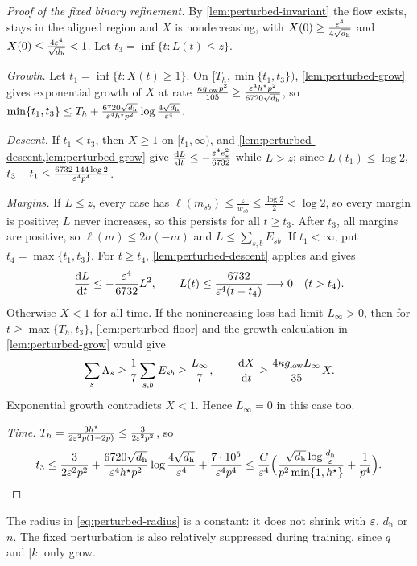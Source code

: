 \begin{proof}[Proof of the fixed binary refinement]
By \cref{lem:perturbed-invariant} the flow exists, stays in the aligned region and $X$ is nondecreasing, with
$X(0)\ge\frac{\varepsilon^4}{4\sqrt{d_{\mathrm h}}}$ and $X(0)\le\frac{4\varepsilon^4}{\sqrt{d_{\mathrm h}}}<1$. Let $t_3=\inf\{t:L(t)\le z\}$.

\emph{Growth.} Let $t_1=\inf\{t:X(t)\ge1\}$. On $[T_h,\min\{t_1,t_3\})$, \cref{lem:perturbed-grow} gives exponential growth of $X$ at rate
$\frac{\kappa g_{\mathrm{low}}p^2}{105}\ge\frac{\varepsilon^4h^\star p^2}{6720\sqrt{d_{\mathrm h}}}$, so
$\min\{t_1,t_3\}\le T_h+\frac{6720\sqrt{d_{\mathrm h}}}{\varepsilon^4h^\star p^2}\log\frac{4\sqrt{d_{\mathrm h}}}{\varepsilon^4}$.

\emph{Descent.} If $t_1<t_3$, then $X\ge1$ on $[t_1,\infty)$, and \cref{lem:perturbed-descent,lem:perturbed-grow} give
$\ddt{L}\le-\frac{\initscale^4e_\ast^2}{6732}$ while $L>z$; since $L(t_1)\le\log2$, $t_3-t_1\le\frac{6732\cdot144\log2}{\varepsilon^4p^4}$.

\emph{Margins.} If $L\le z$, every case has $\ell(m_{sb})\le\frac{z}{w_{sb}}\le\frac{\log2}2<\log2$, so every margin is positive; $L$ never increases,
so this persists for all $t\ge t_3$. After $t_3$, all margins are positive, so
$\ell(m)\le2\sigma(-m)$ and $L\le\sum_{s,b}E_{sb}$.
If $t_1<\infty$, put $t_4=\max\{t_1,t_3\}$. For $t\ge t_4$,
\cref{lem:perturbed-descent} applies and gives
\[
 \ddt{L}\le-\frac{\initscale^4}{6732}L^2,\qquad
 L(t)\le\frac{6732}{\initscale^4(t-t_4)}\longrightarrow0
 \quad(t>t_4).
\]
Otherwise $X<1$ for all time. If the nonincreasing loss had limit
$L_\infty>0$, then for $t\ge\max\{T_h,t_3\}$,
\cref{lem:perturbed-floor} and the growth calculation in
\cref{lem:perturbed-grow} would give
\[
 \sum_s\Lambda_s\ge\frac17\sum_{s,b}E_{sb}\ge\frac{L_\infty}{7},\qquad
 \ddt{X}\ge\frac{4\kappa g_{\mathrm{low}}L_\infty}{35}X.
\]
Exponential growth contradicts $X<1$. Hence $L_\infty=0$ in this case too.

\emph{Time.} $T_h=\frac{3h^\star}{2\varepsilon^2p(1-2p)}\le\frac{3}{2\varepsilon^2p^2}$, so
\[
 t_3\le\frac{3}{2\varepsilon^2p^2}+\frac{6720\sqrt{d_{\mathrm h}}}{\varepsilon^4h^\star p^2}\log\frac{4\sqrt{d_{\mathrm h}}}{\varepsilon^4}+\frac{7\cdot10^5}{\varepsilon^4p^4}
 \le\frac{C}{\varepsilon^4}\Bigl(\frac{\sqrt{d_{\mathrm h}}\log\frac{d_{\mathrm h}}{\varepsilon}}{p^2\min\{1,h^\star\}}+\frac1{p^4}\Bigr).\qedhere
\]
\end{proof}

The radius in \cref{eq:perturbed-radius} is a constant: it does not shrink with $\varepsilon$, $d_{\mathrm h}$ or $n$. The fixed perturbation is also
relatively suppressed during training, since $q$ and $|k|$ only grow.


